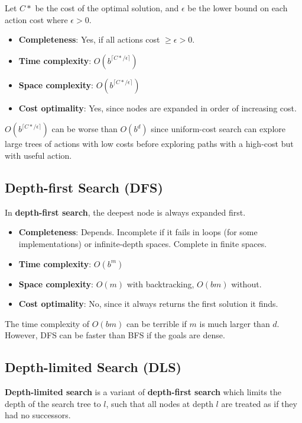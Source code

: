 Let $C*$ be the cost of the optimal solution, and $\epsilon$ be the lower bound on each action cost where $\epsilon > 0$.

\begin{itemize}
    \item \textbf{Completeness}: Yes, if all actions cost $\ge \epsilon > 0$.
    \item \textbf{Time complexity}: $O(b^{\lceil C* / \epsilon \rceil})$
    \item \textbf{Space complexity}: $O(b^{\lceil C* / \epsilon \rceil})$
    \item \textbf{Cost optimality}: Yes, since nodes are expanded in order of increasing cost.
\end{itemize}

$O(b^{\lceil C* / \epsilon \rceil})$ can be worse than $O(b^d)$ since uniform-cost search can explore large trees of actions with low costs before exploring paths with a high-cost but with useful action.


\subsection{Depth-first Search (DFS)}

In \textbf{depth-first search}, the deepest node is always expanded first.

\begin{itemize}
    \item \textbf{Completeness}: Depends. Incomplete if it fails in loops (for some implementations) or infinite-depth spaces. Complete in finite spaces.
    \item \textbf{Time complexity}: $O(b^m)$
    \item \textbf{Space complexity}: $O(m)$ with backtracking, $O(bm)$ without.
    \item \textbf{Cost optimality}: No, since it always returns the first solution it finds.
\end{itemize}

The time complexity of $O(bm)$ can be terrible if $m$ is much larger than $d$. However, DFS can be faster than BFS if the goals are dense.


\subsection{Depth-limited Search (DLS)}

\textbf{Depth-limited search} is a variant of \textbf{depth-first search} which limits the depth of the search tree to $l$, such that all nodes at depth $l$ are treated as if they had no successors.

